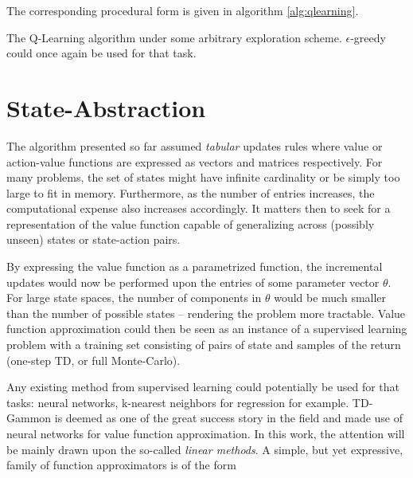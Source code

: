 The corresponding procedural form is given in algorithm \ref{alg:qlearning}.

\begin{algorithm}
\DontPrintSemicolon
{}
\caption{The Q-Learning algorithm under some arbitrary exploration scheme.
$\epsilon$-greedy could once again be used for that task.}
\label{alg:qlearning}
\end{algorithm}

\section{State-Abstraction}
The algorithm presented so far assumed \textit{tabular} updates rules where value or
action-value functions are expressed as vectors and matrices respectively. For many
problems, the set of states might have infinite cardinality or be simply too large to fit in
memory. Furthermore, as the number of entries increases, the computational expense
 also increases accordingly. It matters then to seek for a representation of the
value function capable of generalizing across (possibly unseen) states or state-action
pairs.

By expressing the value function as a parametrized function, the incremental updates
would now be performed upon the entries of some parameter vector $\theta$. For
large state spaces, the number of components in $\theta$ would be much smaller than
the number of possible states -- rendering the problem more tractable. Value function
approximation could then be seen as an instance of a supervised learning problem
with a training set consisting of pairs of state and samples of the return (one-step TD,
or full Monte-Carlo).

Any existing method from supervised learning could potentially be used for that tasks:
neural networks, k-nearest neighbors for regression for example. TD-Gammon
\cite{Tesauro1995} is deemed as one of the great success story in the field and made 
use of neural networks for value function approximation. In this work, the attention
will be mainly drawn upon the so-called \textit{linear methods}. A simple, but yet
expressive, family of function approximators is of the form

